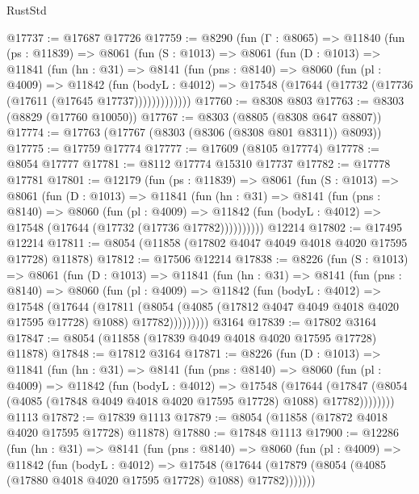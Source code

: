 \begin{lexlean}{RustStd}
\begin{coremodule}
@17737 := @17687 @17726
@17759 := @8290
    (fun (Γ : @8065) =>
    @11840
      (fun (ps : @11839) =>
      @8061
        (fun (S : @1013) =>
        @8061
          (fun (D : @1013) =>
          @11841
            (fun (hn : @31) =>
            @8141
              (fun (pns : @8140) =>
              @8060
                (fun (pl : @4009) =>
                @11842
                  (fun (bodyL : @4012) =>
                  @17548 (@17644 (@17732 (@17736 (@17611 (@17645 @17737)))))))))))))
@17760 := @8308 @803
@17763 := @8303 (@8829 (@17760 @10050))
@17767 := @8303 (@8805 (@8308 @647 @8807))
@17774 := @17763 (@17767 (@8303 (@8306 (@8308 @801 @8311)) @8093))
@17775 := @17759 @17774
@17777 := @17609 (@8105 @17774)
@17778 := @8054 @17777
@17781 := @8112 @17774 @15310 @17737
@17782 := @17778 @17781
@17801 := @12179
    (fun (ps : @11839) =>
    @8061
      (fun (S : @1013) =>
      @8061
        (fun (D : @1013) =>
        @11841
          (fun (hn : @31) =>
          @8141
            (fun (pns : @8140) =>
            @8060
              (fun (pl : @4009) =>
              @11842 (fun (bodyL : @4012) => @17548 (@17644 (@17732 (@17736 @17782))))))))))
    @12214
@17802 := @17495 @12214
@17811 := @8054 (@11858 (@17802 @4047 @4049 @4018 @4020 @17595 @17728) @11878)
@17812 := @17506 @12214
@17838 := @8226
    (fun (S : @1013) =>
    @8061
      (fun (D : @1013) =>
      @11841
        (fun (hn : @31) =>
        @8141
          (fun (pns : @8140) =>
          @8060
            (fun (pl : @4009) =>
            @11842
              (fun (bodyL : @4012) =>
              @17548
                (@17644
                  (@17811
                    (@8054
                      (@4085 (@17812 @4047 @4049 @4018 @4020 @17595 @17728) @1088)
                      @17782)))))))))
    @3164
@17839 := @17802 @3164
@17847 := @8054 (@11858 (@17839 @4049 @4018 @4020 @17595 @17728) @11878)
@17848 := @17812 @3164
@17871 := @8226
    (fun (D : @1013) =>
    @11841
      (fun (hn : @31) =>
      @8141
        (fun (pns : @8140) =>
        @8060
          (fun (pl : @4009) =>
          @11842
            (fun (bodyL : @4012) =>
            @17548
              (@17644
                (@17847 (@8054 (@4085 (@17848 @4049 @4018 @4020 @17595 @17728) @1088) @17782))))))))
    @1113
@17872 := @17839 @1113
@17879 := @8054 (@11858 (@17872 @4018 @4020 @17595 @17728) @11878)
@17880 := @17848 @1113
@17900 := @12286
    (fun (hn : @31) =>
    @8141
      (fun (pns : @8140) =>
      @8060
        (fun (pl : @4009) =>
        @11842
          (fun (bodyL : @4012) =>
          @17548
            (@17644 (@17879 (@8054 (@4085 (@17880 @4018 @4020 @17595 @17728) @1088) @17782)))))))

\end{coremodule}
\end{lexlean}
